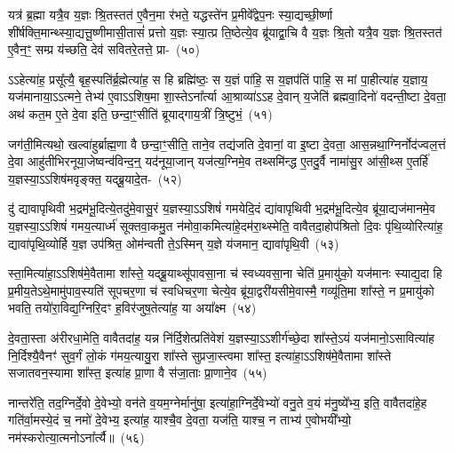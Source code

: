 यत्र॑ ब्र॒ह्मा यत्रै॒व य॒ज्ञः श्रि॒तस्तत॑ ए॒वैन॒मा र॑भते॒ यद्धस्ते॑न प्र॒मीवे᳚द्वेप॒नः स्या॒द्यच्छी॒र्ष्णा शी॑र्\mbox{}षक्ति॒मान्थ्स्या॒द्यत्तू॒ष्णीमासी॒तासं॑ प्रत्तो य॒ज्ञः स्या॒त्प्र ति॒ष्ठेत्ये॒व ब्रू॑याद्वा॒चि वै य॒ज्ञः श्रि॒तो यत्रै॒व य॒ज्ञः श्रि॒तस्तत॑ ए॒वैन॒ꣳ॒ सम्प्र य॑च्छति॒ देव॑ सवितरे॒तत्ते॒ प्रा-~(५०)\ip

ऽ\-ऽहेत्या॑ह॒ प्रसू᳚त्यै॒ बृह॒स्पति॑र्ब्र॒ह्मेत्या॑ह॒ स हि ब्रह्मि॑ष्ठः॒ स य॒ज्ञं पा॑हि॒ स य॒ज्ञप॑तिं पाहि॒ स मां पा॒हीत्या॑ह य॒ज्ञाय॒ यज॑मानाया॒\-ऽऽ\-त्मने॒ तेभ्य॑ ए॒वा\-ऽऽ\-शिष॒मा शा॒स्ते\-ऽना᳚र्त्या आ॒श्राव्या॑\-ऽ\-ऽ\-ह दे॒वान् य॒जेति॑ ब्रह्मवा॒दिनो॑ वदन्ती॒ष्टा दे॒वता॒ अथ॑ कत॒म ए॒ते दे॒वा इति॒ छन्दा॒ꣳ॒सीति॑ ब्रूयाद्गाय॒त्रीं त्रि॒ष्टुभं॒~(५१)\ip

जग॑ती॒मित्यथो॒ खल्वा॑हुर्ब्राह्म॒णा वै छन्दा॒ꣳ॒सीति॒ ताने॒व तद्य॑जति दे॒वानां॒ वा इ॒ष्टा दे॒वता॒ आस॒न्नथा॒ग्निर्नोद॑ज्वल॒त्तं दे॒वा आहु॑तीभिरनूया॒जेष्वन्व॑विन्द॒न्॒ यद॑नूया॒जान् यज॑त्य॒ग्निमे॒व तथ्समि॑न्द्ध ए॒तदु॒र्वै नामा॑सु॒र आ॑सी॒थ्स ए॒तर्\mbox{}हि॑ य॒ज्ञस्या॒\-ऽऽ\-शिष॑मवृङ्क्त॒ यद्ब्रू॒यादे॒त-~(५२)\ip

दु॑ द्यावापृथिवी भ॒द्रम॑भू॒दित्ये॒तदु॑मे॒वासु॒रं य॒ज्ञस्या॒\-ऽऽ\-शिषं॑ गमयेदि॒दं द्या॑वापृथिवी भ॒द्रम॑भू॒दित्ये॒व ब्रू॑या॒द्यज॑मानमे॒व य॒ज्ञस्या॒\-ऽऽ\-शिषं॑ गमय॒त्यार्ध्म॑ सूक्तवा॒कमु॒त न॑मोवा॒कमित्या॑\-हे॒दम॑रा॒थ्स्मेति॒ वावैतदा॒होप॑श्रितो दि॒वः पृ॑थि॒व्योरित्या॑ह॒ द्यावा॑पृथि॒व्योर्\mbox{}हि य॒ज्ञ उप॑श्रित॒ ओम॑न्वती ते॒\-ऽस्मिन् य॒ज्ञे य॑जमान॒ द्यावा॑\-पृथि॒वी~(५३)\ip

स्ता॒मित्या॑हा॒\-ऽऽ\-शिष॑मे॒वैतामा शा᳚स्ते॒ यद्ब्रू॒याथ्सू॑पावसा॒ना च॑ स्वध्यवसा॒ना चेति॑ प्र॒मायु॑को॒ यज॑मानः स्याद्य॒दा हि प्र॒मीय॒ते\-ऽथे॒मामु॑पाव॒स्यति॑ सूपचर॒णा च॑ स्वधिचर॒णा चेत्ये॒व ब्रू॑या॒द्वरी॑यसीमे॒वास्मै॒ गव्यू॑ति॒मा शा᳚स्ते॒ न प्र॒मायु॑को भवति॒ तयो॑रा॒विद्य॒ग्निरि॒दꣳ ह॒विर॑जुष॒तेत्या॑ह॒ या अया᳚क्ष्म~(५४)\ip

दे॒वता॒स्ता अ॑रीरधा॒मेति॒ वावैतदा॑ह॒ यन्न नि॑र्दि॒शेत्प्रति॑वेशं य॒ज्ञस्या॒\-ऽऽ\-शीर्ग॑च्छे॒दा शा᳚स्ते॒\-ऽयं यज॑मानो॒\-ऽसावित्या॑ह नि॒र्दिश्यै॒वैनꣳ॑ सुव॒र्गं लो॒कं ग॑मय॒त्यायु॒रा शा᳚स्ते सुप्रजा॒स्त्वमा शा᳚स्त॒ इत्या॑हा॒\-ऽऽ\-शिष॑मे॒वैतामा शा᳚स्ते सजातवन॒स्यामा शा᳚स्त॒ इत्या॑ह प्रा॒णा वै स॑जा॒ताः प्रा॒णाने॒व~(५५)\ip

नान्तरे॑ति॒ तद॒ग्निर्दे॒वो दे॒वेभ्यो॒ वन॑ते व॒यम॒ग्नेर्मानु॑षा॒ इत्या॑हा॒ग्निर्दे॒वेभ्यो॑ वनु॒ते व॒यं म॑नु॒ष्ये᳚भ्य॒ इति॒ वावैतदा॑हे॒ह गति॑र्वा॒मस्ये॒दं च॒ नमो॑ दे॒वेभ्य॒ इत्या॑ह॒ याश्चै॒व दे॒वता॒ यज॑ति॒ याश्च॒ न ताभ्य॑ ए॒वोभयी᳚भ्यो॒ नम॑स्करोत्या॒त्मनो\-ऽना᳚र्त्यै॥~(५६)\ip

